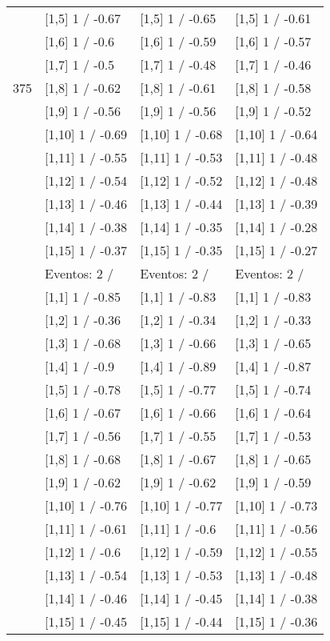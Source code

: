 \begin{table}
\begin{tabular}[t]{llll}
 & {}[1,5] 1  / -0.67 & {}[1,5] 1  / -0.65 & {}[1,5] 1  / -0.61\\
 & {}[1,6] 1  / -0.6 & {}[1,6] 1  / -0.59 & {}[1,6] 1  / -0.57\\
 & {}[1,7] 1  / -0.5 & {}[1,7] 1  / -0.48 & {}[1,7] 1  / -0.46\\
375 & {}[1,8] 1  / -0.62 & {}[1,8] 1  / -0.61 & {}[1,8] 1  / -0.58\\
\addlinespace
 & {}[1,9] 1  / -0.56 & {}[1,9] 1  / -0.56 & {}[1,9] 1  / -0.52\\
 & {}[1,10] 1  / -0.69 & {}[1,10] 1  / -0.68 & {}[1,10] 1  / -0.64\\
 & {}[1,11] 1  / -0.55 & {}[1,11] 1  / -0.53 & {}[1,11] 1  / -0.48\\
 & {}[1,12] 1  / -0.54 & {}[1,12] 1  / -0.52 & {}[1,12] 1  / -0.48\\
 & {}[1,13] 1  / -0.46 & {}[1,13] 1  / -0.44 & {}[1,13] 1  / -0.39\\
\addlinespace
 & {}[1,14] 1  / -0.38 & {}[1,14] 1  / -0.35 & {}[1,14] 1  / -0.28\\
 & {}[1,15] 1  / -0.37 & {}[1,15] 1  / -0.35 & {}[1,15] 1  / -0.27\\
 & Eventos:  2 / & Eventos:  2 / & Eventos:  2 /\\
 & {}[1,1] 1  / -0.85 & {}[1,1] 1  / -0.83 & {}[1,1] 1  / -0.83\\
 & {}[1,2] 1  / -0.36 & {}[1,2] 1  / -0.34 & {}[1,2] 1  / -0.33\\
\addlinespace
 & {}[1,3] 1  / -0.68 & {}[1,3] 1  / -0.66 & {}[1,3] 1  / -0.65\\
 & {}[1,4] 1  / -0.9 & {}[1,4] 1  / -0.89 & {}[1,4] 1  / -0.87\\
 & {}[1,5] 1  / -0.78 & {}[1,5] 1  / -0.77 & {}[1,5] 1  / -0.74\\
 & {}[1,6] 1  / -0.67 & {}[1,6] 1  / -0.66 & {}[1,6] 1  / -0.64\\
 & {}[1,7] 1  / -0.56 & {}[1,7] 1  / -0.55 & {}[1,7] 1  / -0.53\\
\addlinespace
500 & {}[1,8] 1  / -0.68 & {}[1,8] 1  / -0.67 & {}[1,8] 1  / -0.65\\
 & {}[1,9] 1  / -0.62 & {}[1,9] 1  / -0.62 & {}[1,9] 1  / -0.59\\
 & {}[1,10] 1  / -0.76 & {}[1,10] 1  / -0.77 & {}[1,10] 1  / -0.73\\
 & {}[1,11] 1  / -0.61 & {}[1,11] 1  / -0.6 & {}[1,11] 1  / -0.56\\
 & {}[1,12] 1  / -0.6 & {}[1,12] 1  / -0.59 & {}[1,12] 1  / -0.55\\
\addlinespace
 & {}[1,13] 1  / -0.54 & {}[1,13] 1  / -0.53 & {}[1,13] 1  / -0.48\\
 & {}[1,14] 1  / -0.46 & {}[1,14] 1  / -0.45 & {}[1,14] 1  / -0.38\\
 & {}[1,15] 1  / -0.45 & {}[1,15] 1  / -0.44 & {}[1,15] 1  / -0.36\\
\bottomrule
\end{tabular}
\end{table}
